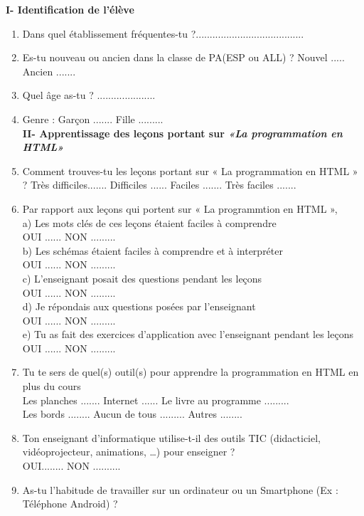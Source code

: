 \textbf{I- Identification de l'élève}
\begin{enumerate}
\item Dans quel établissement fréquentes-tu ?.......................................
\item Es-tu nouveau ou ancien dans la classe de PA(ESP ou ALL) ?	Nouvel .....	Ancien .......
\item Quel âge as-tu ? .....................
\item Genre : Garçon ....... Fille .........\\

\textbf{II-	Apprentissage des leçons portant sur \emph{«La programmation en HTML»}}\\

\item Comment trouves-tu les leçons portant sur « La programmation en HTML » ?
Très difficiles....... Difficiles ...... Faciles ....... Très faciles .......
\item Par rapport aux leçons qui portent sur « La programmtion en HTML »,\\
a)	Les mots clés de ces leçons étaient faciles à comprendre\\
OUI ...... NON .........\\
b)	Les schémas étaient faciles à comprendre et à interpréter\\
OUI ...... NON .........\\
c)	L'enseignant posait des questions pendant les leçons\\
OUI ...... NON .........\\
d)	Je répondais aux questions posées par l'enseignant\\
OUI ...... NON .........\\
e)	Tu as fait des exercices d'application avec l'enseignant pendant les leçons\\
OUI ...... NON .........\\
\item Tu te sers de quel(s) outil(s) pour apprendre la programmation en HTML en plus du cours\\
Les planches ....... Internet ...... Le livre au programme .........\\ 	
Les bords ........	 Aucun de tous ......... Autres ........
\item Ton enseignant d'informatique utilise-t-il des outils TIC (didacticiel, vidéoprojecteur, animations, …) pour enseigner ?\\ 	
OUI........ NON ..........
\item As-tu l'habitude de travailler sur un ordinateur ou un Smartphone (Ex : Téléphone Android) ?\\

\end{enumerate}
